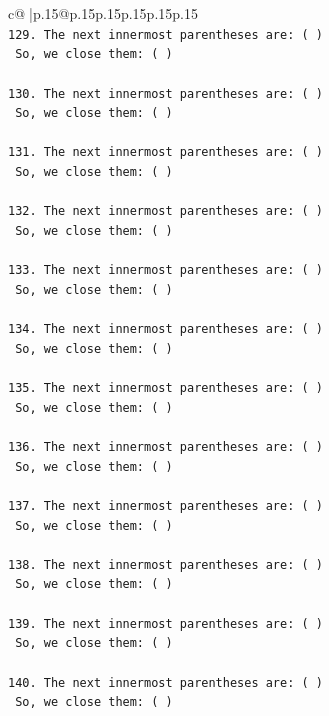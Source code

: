 \documentclass{article}
\begin{document}
{\begin{supertabular}{c@{$\;$}|p{.15\linewidth}@{}p{.15\linewidth}p{.15\linewidth}p{.15\linewidth}p{.15\linewidth}p{.15\linewidth}}
{{{\\ 
\texttt{129. The next innermost parentheses are: ( ) } \\
\texttt{    So, we close them: ( ) } \\
\\ 
\texttt{130. The next innermost parentheses are: ( ) } \\
\texttt{    So, we close them: ( ) } \\
\\ 
\texttt{131. The next innermost parentheses are: ( ) } \\
\texttt{    So, we close them: ( ) } \\
\\ 
\texttt{132. The next innermost parentheses are: ( ) } \\
\texttt{    So, we close them: ( ) } \\
\\ 
\texttt{133. The next innermost parentheses are: ( ) } \\
\texttt{    So, we close them: ( ) } \\
\\ 
\texttt{134. The next innermost parentheses are: ( ) } \\
\texttt{    So, we close them: ( ) } \\
\\ 
\texttt{135. The next innermost parentheses are: ( ) } \\
\texttt{    So, we close them: ( ) } \\
\\ 
\texttt{136. The next innermost parentheses are: ( ) } \\
\texttt{    So, we close them: ( ) } \\
\\ 
\texttt{137. The next innermost parentheses are: ( ) } \\
\texttt{    So, we close them: ( ) } \\
\\ 
\texttt{138. The next innermost parentheses are: ( ) } \\
\texttt{    So, we close them: ( ) } \\
\\ 
\texttt{139. The next innermost parentheses are: ( ) } \\
\texttt{    So, we close them: ( ) } \\
\\ 
\texttt{140. The next innermost parentheses are: ( ) } \\
\texttt{    So, we close them: ( ) } \\
}}}
\end{supertabular}}
\end{document}
